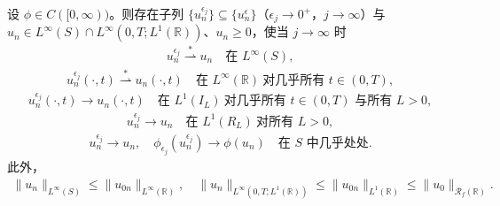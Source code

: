 \documentclass[../../main.tex]{subfiles}%
\begin{document}
\begin{lemma}\label{lemma:ch07-7.4.5}
设 $\phi\in C([0,\infty))$。则存在子列 $\{u_n^{\epsilon_j}\}\subseteq\{u_n^\epsilon\}$（$\epsilon_j\to0^+$，$j\to\infty$）与 $u_n\in L^\infty(S)\cap L^\infty(0,T;L^1(\mathbb{R}))$、$u_n\geqslant0$，使当 $j\to\infty$ 时
\begin{align}
u_n^{\epsilon_j}\stackrel{*}{\rightharpoonup}u_n\quad\text{在 }L^\infty(S), \label{align:ch07-7.66}
\end{align}
\begin{align}
u_n^{\epsilon_j}(\cdot,t)\stackrel{*}{\rightharpoonup}u_n(\cdot,t)\quad\text{在 }L^\infty(\mathbb{R})\ \text{对几乎所有 }t\in(0,T), \label{align:ch07-7.67}
\end{align}
\begin{align}
u_n^{\epsilon_j}(\cdot,t)\to u_n(\cdot,t)\quad\text{在 }L^1(I_L)\ \text{对几乎所有 }t\in(0,T)\text{ 与所有 }L>0, \label{align:ch07-7.68}
\end{align}
\begin{align}
u_n^{\epsilon_j}\to u_n\quad\text{在 }L^1(R_L)\ \text{对所有 }L>0, \label{align:ch07-7.69}
\end{align}
\begin{align}
u_n^{\epsilon_j}\to u_n,\quad \phi_{\epsilon_j}(u_n^{\epsilon_j})\to\phi(u_n)\quad\text{在 }S\text{ 中几乎处处}. \label{align:ch07-7.70}
\end{align}
此外，
\begin{align}
\|u_n\|_{L^\infty(S)}\leqslant\|u_{0n}\|_{L^\infty(\mathbb{R})},\quad
\|u_n\|_{L^\infty(0,T;L^1(\mathbb{R}))}\leqslant\|u_{0n}\|_{L^1(\mathbb{R})}\leqslant\|u_0\|_{\mathscr{R}_f(\mathbb{R})}. \label{align:ch07-7.71}
\end{align}
\end{lemma}
\end{document}

